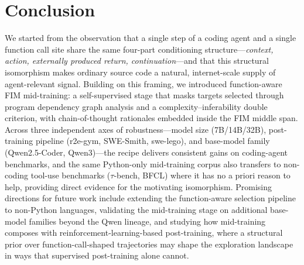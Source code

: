 \section{Conclusion}
\label{sec:conclusion}

We started from the observation that a single step of a coding agent and
a single function call site share the same four-part conditioning
structure---\textit{context, action, externally produced return,
continuation}---and that this structural isomorphism makes ordinary
source code a natural, internet-scale supply of agent-relevant signal.
Building on this framing, we introduced function-aware FIM mid-training:
a self-supervised stage that masks targets selected through program
dependency graph analysis and a complexity--inferability double
criterion, with chain-of-thought rationales embedded inside the FIM
middle span. Across three independent axes of robustness---model size
(7B/14B/32B), post-training pipeline (r2e-gym, SWE-Smith, swe-lego), and
base-model family (Qwen2.5-Coder, Qwen3)---the recipe delivers
consistent gains on coding-agent benchmarks, and the same Python-only
mid-training corpus also transfers to non-coding tool-use benchmarks
($\tau$-bench, BFCL) where it has no a priori reason to help, providing
direct evidence for the motivating isomorphism. Promising directions for
future work include extending the function-aware selection pipeline to
non-Python languages, validating the mid-training stage on additional
base-model families beyond the Qwen lineage, and studying how
mid-training composes with reinforcement-learning-based post-training,
where a structural prior over function-call-shaped trajectories may
shape the exploration landscape in ways that supervised post-training
alone cannot.

